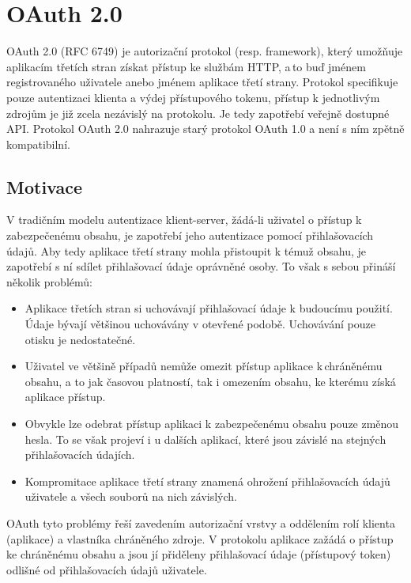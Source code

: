 \documentclass[]{fithesis3}
\begin{document}
\chapter{OAuth 2.0}

OAuth 2.0 (RFC 6749) je autorizační protokol (resp. framework), který umožňuje aplikacím třetích stran získat přístup ke službám HTTP, a\,to buď jménem registrovaného uživatele anebo jménem aplikace třetí strany. Protokol specifikuje pouze autentizaci klienta a výdej přístupového tokenu, přístup k jednotlivým zdrojům je již zcela nezávislý na protokolu. Je tedy zapotřebí veřejně dostupné API. Protokol OAuth 2.0 nahrazuje starý protokol OAuth 1.0 a není s ním zpětně kompatibilní.

	\section{Motivace}

	V tradičním modelu autentizace klient-server, žádá-li uživatel o přístup k zabezpečenému 			obsahu, je zapotřebí jeho autentizace pomocí přihlašovacích údajů. Aby tedy aplikace třetí 			strany mohla přistoupit k témuž obsahu, je zapotřebí s ní sdílet přihlašovací údaje oprávněné 		osoby. To však s sebou přináší několik problémů:

		\begin{itemize}
  		\item 
		Aplikace třetích stran si uchovávají přihlašovací údaje k budoucímu použití. Údaje bývají 			většinou uchovávány v otevřené podobě. Uchovávání pouze otisku je nedostatečné.

 		 \item 
		Uživatel ve většině případů nemůže omezit přístup aplikace k\,chráněnému obsahu, a to 			jak časovou platností, tak i omezením obsahu, ke kterému získá aplikace přístup.

 		 \item 
		Obvykle lze odebrat přístup aplikaci k zabezpečenému obsahu pouze 							změnou hesla. To se však projeví i u dalších aplikací, které jsou závislé na stejných 				přihlašovacích údajích.

  		\item 
		Kompromitace aplikace třetí strany znamená ohrožení přihlašovacích údajů 						uživatele a všech souborů na nich závislých.
		\end{itemize}

	OAuth tyto problémy řeší zavedením autorizační vrstvy a oddělením rolí klienta 					(aplikace) a vlastníka chráněného zdroje. V protokolu aplikace zažádá o přístup ke 				chráněnému obsahu  a jsou jí přiděleny přihlašovací údaje (přístupový token) odlišné od 			přihlašovacích údajů uživatele. 
\end{document}
